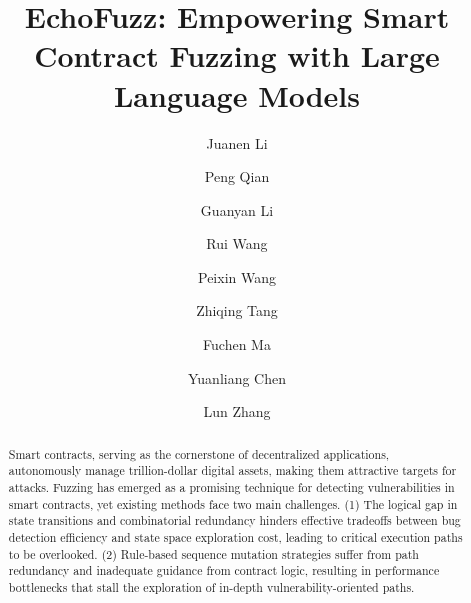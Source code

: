 \documentclass[sigconf]{acmart}
\begin{document}
\begin{sloppypar}

\title{EchoFuzz: Empowering Smart Contract Fuzzing with Large Language Models}

\author{Juanen Li}

\author{Peng Qian}
\email{}

\author{Guanyan Li}

\author{Rui Wang}

\author{Peixin Wang}

\author{Zhiqing Tang}
\email{}

\author{Fuchen Ma}
\email{}

\author{Yuanliang Chen}
\email{}


\author{Lun Zhang}
\email{}


\begin{abstract}
Smart contracts, serving as the cornerstone of decentralized applications, autonomously manage trillion-dollar digital assets, making them attractive targets for attacks. Fuzzing has emerged as a promising technique for detecting vulnerabilities in smart contracts, yet existing methods face two main challenges. (1) The logical gap in state transitions and combinatorial redundancy hinders effective tradeoffs between bug detection efficiency and state space exploration cost, leading to critical execution paths to be overlooked. (2) Rule-based sequence mutation strategies suffer from path redundancy and inadequate guidance from contract logic, resulting in performance bottlenecks that stall the exploration of in-depth vulnerability-oriented paths.


\end{abstract}
\end{sloppypar}
\end{document}

